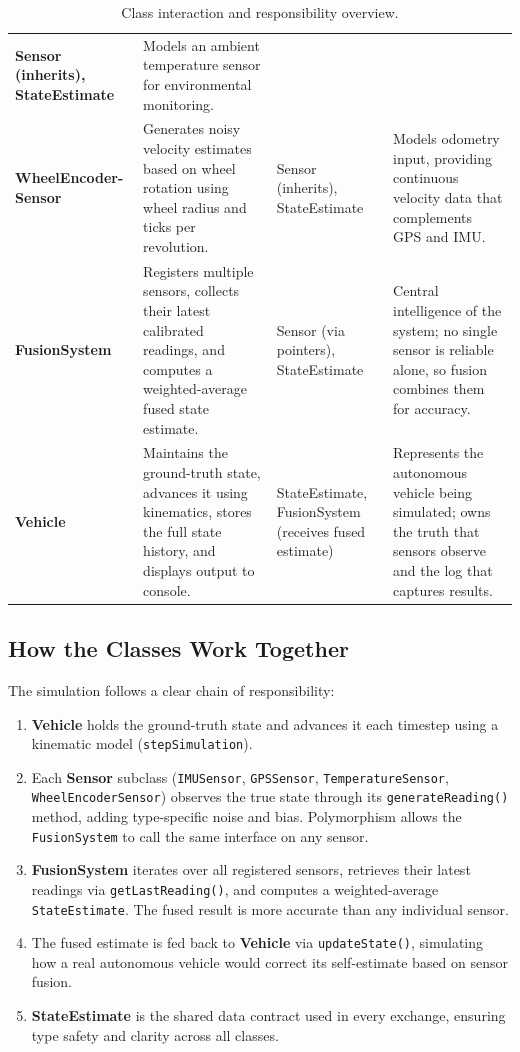 \documentclass[a4paper,11pt]{article}
\begin{document}
\begin{table}[H]
\begin{tabularx}{\textwidth}{>{\bfseries\ttfamily}p{2.2cm} X p{2.8cm} X}
Sensor (inherits), StateEstimate &
Models an ambient temperature sensor for environmental monitoring. \\
\addlinespace
WheelEncoder- Sensor &
Generates noisy velocity estimates based on wheel rotation using wheel radius and ticks per revolution. &
Sensor (inherits), StateEstimate &
Models odometry input, providing continuous velocity data that complements GPS and IMU. \\
\addlinespace
FusionSystem &
Registers multiple sensors, collects their latest calibrated readings, and computes a weighted-average fused state estimate. &
Sensor (via pointers), StateEstimate &
Central intelligence of the system; no single sensor is reliable alone, so fusion combines them for accuracy. \\
\addlinespace
Vehicle &
Maintains the ground-truth state, advances it using kinematics, stores the full state history, and displays output to console. &
StateEstimate, FusionSystem (receives fused estimate) &
Represents the autonomous vehicle being simulated; owns the truth that sensors observe and the log that captures results. \\
\bottomrule
\end{tabularx}
\caption{Class interaction and responsibility overview.}
\end{table}

\subsection{How the Classes Work Together}

The simulation follows a clear chain of responsibility:

\begin{enumerate}[leftmargin=1.5cm]
\item \textbf{Vehicle} holds the ground-truth state and advances it each timestep using a kinematic model (\texttt{stepSimulation}).
\item Each \textbf{Sensor} subclass (\texttt{IMUSensor}, \texttt{GPSSensor}, \texttt{TemperatureSensor}, \texttt{WheelEncoderSensor}) observes the true state through its \texttt{generateReading()} method, adding type-specific noise and bias. Polymorphism allows the \texttt{FusionSystem} to call the same interface on any sensor.
\item \textbf{FusionSystem} iterates over all registered sensors, retrieves their latest readings via \texttt{getLastReading()}, and computes a weighted-average \texttt{StateEstimate}. The fused result is more accurate than any individual sensor.
\item The fused estimate is fed back to \textbf{Vehicle} via \texttt{updateState()}, simulating how a real autonomous vehicle would correct its self-estimate based on sensor fusion.
\item \textbf{StateEstimate} is the shared data contract used in every exchange, ensuring type safety and clarity across all classes.
\end{enumerate}
\end{document}

